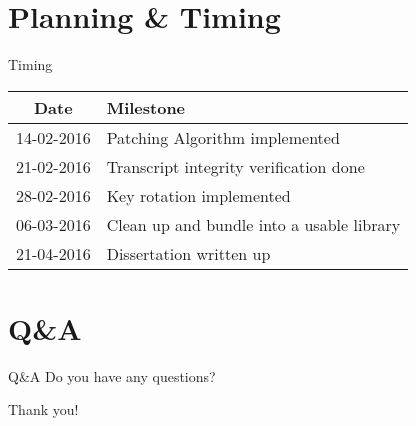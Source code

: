 \documentclass{beamer}
\begin{document}
\section{Planning \& Timing}
\begin{frame}{Timing}
    \begin{tabular*}{0.9\textwidth}{c | l}
        Date & Milestone \\ 
        \hline
        14-02-2016 & Patching Algorithm implemented \\
        21-02-2016 & Transcript integrity verification done \\ 
        28-02-2016 & Key rotation implemented \\
        06-03-2016 & Clean up and bundle into a usable library\\
        21-04-2016 & Dissertation written up \\
    \end{tabular*}
\end{frame}

\section{Q\&A}
\begin{frame}{Q\&A}
    \Large{Do you have any questions?}
\end{frame}

\begin{frame}
    \centering
    \Large{Thank you!}
\end{frame}
\end{document}
